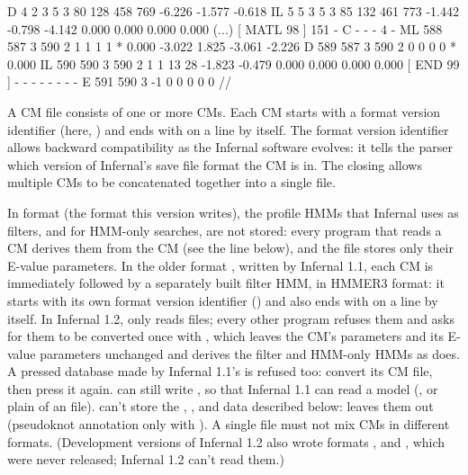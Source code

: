 \begin{tinysreoutput}
     D     4     2 3     5     3    80   128   458   769  -6.226  -1.577  -0.618
    IL     5     5 3     5     3    85   132   461   773  -1.442  -0.798  -4.142                          0.000  0.000  0.000  0.000
(...)
                                             [ MATL   98 ]    151      - C - - -    4    -
    ML   588   587 3   590     2     1     1     1     1       *   0.000                                 -3.022  1.825 -3.061 -2.226
     D   589   587 3   590     2     0     0     0     0       *   0.000
    IL   590   590 3   590     2     1     1    13    28  -1.823  -0.479                                  0.000  0.000  0.000  0.000
                                             [ END    99 ]      -      - - - - -    -    -
     E   591   590 3    -1     0     0     0     0     0
//
\end{tinysreoutput}

A CM file consists of one or more CMs. Each CM starts with a format
version identifier (here, ) and ends with \prog{//}
on a line by itself. The format version identifier allows backward
compatibility as the Infernal software evolves: it tells the parser
which version of Infernal's save file format the CM is in. The closing
\prog{//} allows multiple CMs to be concatenated together into a single
file.

In format  (the format this version writes), the profile HMMs that
Infernal uses as filters, and for HMM-only searches, are not stored:
every program that reads a CM derives them from the CM (see the
 line below), and the file stores only their E-value
parameters. In the older format , written by
Infernal 1.1, each CM is immediately followed by a separately built
filter HMM, in HMMER3 format: it starts with its own format version
identifier () and also ends with \prog{//} on a line by
itself. In Infernal 1.2, only  reads
 files; every other program refuses them and asks
for them to be converted once with , which
leaves the CM's parameters and its  E-value
parameters unchanged and derives the filter and HMM-only HMMs as
 does. A pressed database made by Infernal 1.1's
 is refused too: convert its CM file, then press it
again.  can still write , so that
Infernal 1.1 can read a model (, or
plain  of an  file).
 can't store the , ,
 and  data described below:
 leaves them out (pseudoknot annotation
only with ). A single file must not mix
CMs in different formats. (Development versions of Infernal 1.2 also
wrote formats ,  and , which were
never released; Infernal 1.2 can't read them.)

